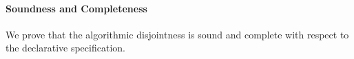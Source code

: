 \begin{comment}
We illustrate \Cref{def:inter:ad} with a few examples:

\begin{enumerate}
  \item $\boldsymbol{A = [[Int]], \ B = \ [[A -> B]]:}$ \\
        $[[findsubtypes Int]]$ returns \{$[[Int]]$\} and $[[findsubtypes A -> B]]$ returns
        \{$[[Top -> Bot]]$\}. Set intersection of \{$[[Int]]$\} and \{$[[Top -> Bot]]$\} is
        empty set \{\}. Therefore, $[[Int]]$ and $[[A -> B]]$ are disjoint types.
  \item $\boldsymbol{A = [[Int]], \ B = \ [[Bot]]:}$ \\
        $[[findsubtypes Int]]$ returns \{$[[Int]]$\} and $[[findsubtypes Bot]]$ returns
        \{\}. Set intersection of \{$[[Int]]$\} and \{\} is
        empty set \{\}. Therefore, $[[Int]]$ and $[[Bot]]$ are disjoint types.
        In general, type $[[Bot]]$ is disjoint to all types because $[[findsubtypes Bot]]$
        will always return \{\} and intersection of \{\} with all other sets is \{\}.
  \item $\boldsymbol{A = [[Int /\ A -> B]], \ B = \ [[Int]]:}$ \\
        $[[findsubtypes Int /\ A -> B]]$ returns \{\} and $[[findsubtypes Int]]$ returns
        \{$[[Int]]$\}. Set intersection of \{\} and \{$[[Int]]$\} is
        empty set \{\}. Therefore, $[[Int /\ A -> B]]$ and $[[Int]]$ are disjoint types.
        In general, intersection type of two disjoint types which is $[[Int /\ A -> B]]$ in this case,
        is always disjoint to all types.
  \item $\boldsymbol{A = [[Int]], \ B = \ [[Top]]:}$ \\
        $[[findsubtypes Int]]$ returns \{$[[Int]]$\} and $[[findsubtypes Top]]$ returns
        \{$[[Int]]$, $[[Top -> Bot]]$\}.
        Set intersection of \{$[[Int]]$\} and \{$[[Int]]$, $[[Top -> Bot]]$\} is
        set \{$[[Int]]$\}. Therefore, $[[Int]]$ and $[[Top]]$ are not disjoint types.
\end{enumerate}
\end{comment}

\paragraph{Soundness and Completeness}

We prove that the algorithmic disjointness is sound and complete with respect to
the declarative specification.

